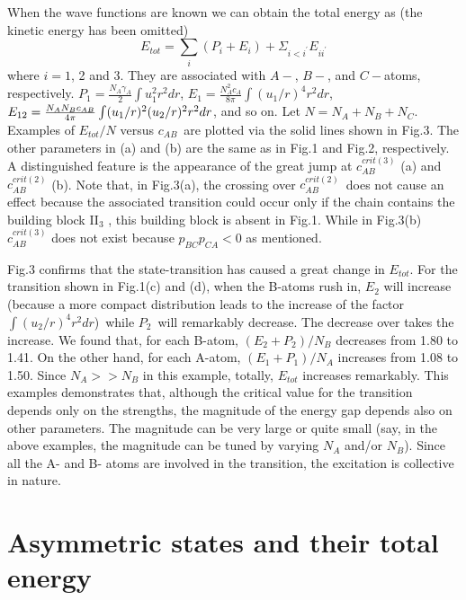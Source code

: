 \documentclass[single-column,showpacs,groupedaddress]{revtex4}
\begin{document}
When the wave functions are known we can obtain the total energy as (the
kinetic energy has been omitted)
\begin{equation}
E_{tot}=\sum_{i}(P_{i}+E_{i})+\Sigma _{i<i^{\prime }}E_{ii^{\prime }}
\label{eq20}
\end{equation}%
where $i=1$, 2 and 3. They are associated with $A-$, $B-$, and $C-$atoms,
respectively. $P_{1}=\frac{N_{A}\gamma _{A}}{2}\int u_{1}^{2}r^{2}dr$, $%
E_{1}=\frac{N_{A}^{2}c_{A}}{8\pi }\int (u_{1}/r)^{4}r^{2}dr$, $E_{12}=\frac{%
N_{A}N_{B}c_{AB}}{4\pi }\int (u_{1}/r)^{2}(u_{2}/r)^{2}r^{2}dr$, and so on.
Let $N=N_{A}+N_{B}+N_{C}$. Examples of $E_{tot}/N$ versus $c_{AB}$\ are
plotted via the solid lines shown in Fig.3. The other parameters in (a) and
(b) are the same as in Fig.1 and Fig.2, respectively. A distinguished
feature is the appearance of the great jump at $c_{AB}^{crit(3)}$ (a) and $%
c_{AB}^{crit(2)}$ (b). Note that, in Fig.3(a), the crossing over $%
c_{AB}^{crit(2)}$\ does not cause an effect because the associated
transition could occur only if the chain contains the building block II$_{3}$%
, this building block is absent in Fig.1. While in Fig.3(b) $c_{AB}^{crit(3)}
$ does not exist because $p_{BC}p_{CA}<0$ as mentioned.

Fig.3 confirms that the state-transition has caused a great change in $%
E_{tot}$. For the transition shown in Fig.1(c) and (d), when the B-atoms
rush in, $E_{2}$ will increase (because a more compact distribution leads to
the increase of the factor $\int (u_{2}/r)^{4}r^{2}dr$)\ while $P_{2}$\ will
remarkably decrease. The decrease over takes the increase. We found that,
for each B-atom, $(E_{2}+P_{2})/N_{B}$ decreases from 1.80 to 1.41. On the
other hand, for each A-atom, $(E_{1}+P_{1})/N_{A}$ increases from 1.08 to
1.50. Since $N_{A}>>N_{B}$ in this example, totally, $E_{tot}$ increases
remarkably. This examples demonstrates that, although the critical value for
the transition depends only on the strengths, the magnitude of the energy
gap depends also on other parameters. The magnitude can be very large or
quite small (say, in the above examples, the magnitude can be tuned by
varying $N_{A}$ and/or $N_{B}$). Since all the A- and B- atoms are involved
in the transition, the excitation is collective in nature.

\section*{Asymmetric states and their total energy}
\end{document}

